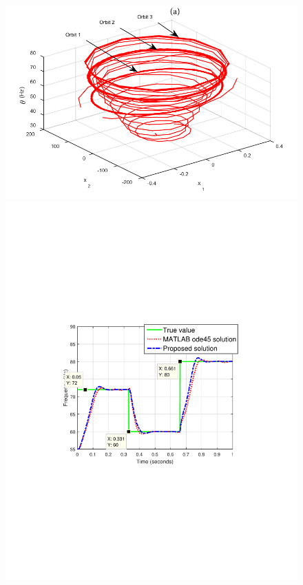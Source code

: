 \documentclass{UCF_ETD}
\begin{document}
  \begin{figure}[H]
  \begin{center}
  \includegraphics[scale=0.8]{NonuniformANF/3dStateSpaceHops}
  \includegraphics[scale=0.8]{NonuniformANF/FrequencyTracking} %

\end{center}
\end{figure}
\end{document}
